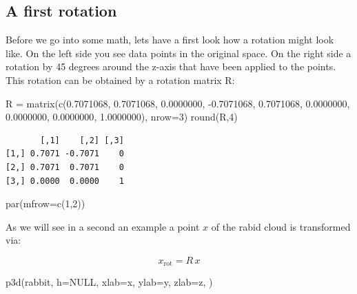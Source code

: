 \documentclass[
  letterpaper,
  DIV=11,
  numbers=noendperiod]{scrartcl}
\newenvironment{Shaded}{\begin{snugshade}}{\end{snugshade}}
\newcommand{\AttributeTok}[1]{\textcolor[rgb]{0.40,0.45,0.13}{#1}}
\newcommand{\ConstantTok}[1]{\textcolor[rgb]{0.56,0.35,0.01}{#1}}
\newcommand{\DecValTok}[1]{\textcolor[rgb]{0.68,0.00,0.00}{#1}}
\newcommand{\FloatTok}[1]{\textcolor[rgb]{0.68,0.00,0.00}{#1}}
\newcommand{\FunctionTok}[1]{\textcolor[rgb]{0.28,0.35,0.67}{#1}}
\newcommand{\NormalTok}[1]{\textcolor[rgb]{0.00,0.23,0.31}{#1}}
\newcommand{\OtherTok}[1]{\textcolor[rgb]{0.00,0.23,0.31}{#1}}
\newcommand{\SpecialCharTok}[1]{\textcolor[rgb]{0.37,0.37,0.37}{#1}}
\newcommand{\StringTok}[1]{\textcolor[rgb]{0.13,0.47,0.30}{#1}}
\begin{document}
\hypertarget{a-first-rotation}{%
\subsection{A first rotation}\label{a-first-rotation}}

Before we go into some math, lets have a first look how a rotation might
look like. On the left side you see data points in the original space.
On the right side a rotation by 45 degrees around the z-axis that have
been applied to the points. This rotation can be obtained by a rotation
matrix R:

\begin{Shaded}
\begin{Highlighting}[]
\NormalTok{R }\OtherTok{=} \FunctionTok{matrix}\NormalTok{(}\FunctionTok{c}\NormalTok{(}\FloatTok{0.7071068}\NormalTok{,  }\FloatTok{0.7071068}\NormalTok{,  }\FloatTok{0.0000000}\NormalTok{, }\SpecialCharTok{{-}}\FloatTok{0.7071068}\NormalTok{,  }\FloatTok{0.7071068}\NormalTok{,  }\FloatTok{0.0000000}\NormalTok{,  }\FloatTok{0.0000000}\NormalTok{,  }\FloatTok{0.0000000}\NormalTok{,  }\FloatTok{1.0000000}\NormalTok{), }\AttributeTok{nrow=}\DecValTok{3}\NormalTok{)}
\FunctionTok{round}\NormalTok{(R,}\DecValTok{4}\NormalTok{)}
\end{Highlighting}
\end{Shaded}

\begin{verbatim}
       [,1]    [,2] [,3]
[1,] 0.7071 -0.7071    0
[2,] 0.7071  0.7071    0
[3,] 0.0000  0.0000    1
\end{verbatim}

\begin{Shaded}
\begin{Highlighting}[]
\FunctionTok{par}\NormalTok{(}\AttributeTok{mfrow=}\FunctionTok{c}\NormalTok{(}\DecValTok{1}\NormalTok{,}\DecValTok{2}\NormalTok{))}
\end{Highlighting}
\end{Shaded}

As we will see in a second an example a point \(x\) of the rabid cloud
is transformed via:

\[
  x_\text{rot} = R \, x
\]

\begin{Shaded}
\begin{Highlighting}[]
\FunctionTok{p3d}\NormalTok{(rabbit, }\AttributeTok{h=}\ConstantTok{NULL}\NormalTok{, }\AttributeTok{xlab=}\StringTok{\textquotesingle{}x\textquotesingle{}}\NormalTok{, }\AttributeTok{ylab=}\StringTok{\textquotesingle{}y\textquotesingle{}}\NormalTok{, }\AttributeTok{zlab=}\StringTok{\textquotesingle{}z\textquotesingle{}}\NormalTok{, )}
\end{Highlighting}
\end{Shaded}
\end{document}
